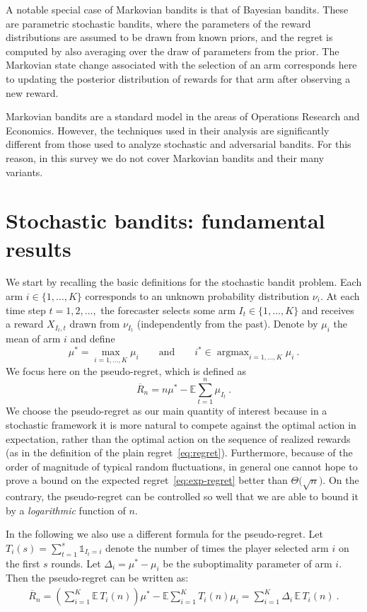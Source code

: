 \documentclass[11pt]{hackednow}
\newcommand{\E}{\mathbb{E}}
\newcommand{\oR}{\overline{R}}
\def\ds1{\mathds{1}}
\newcommand{\argmax}{\mathop{\mathrm{argmax}}}
\begin{document}
A notable special case of Markovian bandits is that of Bayesian bandits. These are parametric stochastic bandits, where the parameters of the reward distributions are assumed to be drawn from known priors, and the regret is computed by also averaging over the draw of parameters from the prior. The Markovian state change associated with the selection of an arm corresponds here to updating the posterior distribution of rewards for that arm after observing a new reward.

Markovian bandits are a standard model in the areas of Operations Research and Economics. However, the techniques used in their analysis are significantly different from those used to analyze stochastic and adversarial bandits. For this reason, in this survey we do not cover Markovian bandits and their many variants.


\chapter{Stochastic bandits: fundamental results}
\label{stochastic}
We start by recalling the basic definitions for the stochastic bandit problem. Each arm $i \in \{1, \hdots, K\}$ corresponds to an unknown probability distribution $\nu_i$. At each time step $t =1, 2, \hdots,$ the forecaster selects some arm $I_t \in \{1, \hdots, K\}$ and receives a reward $X_{I_t,t}$ drawn from $\nu_{I_t}$ (independently from the past). Denote by $\mu_i$ the mean of arm $i$ and define
\[
    \mu^*=\max_{i=1,\hdots,K} \mu_i \qquad\text{and}\qquad i^* \in \argmax_{i=1,\hdots,K} \mu_i~.
\]
We focus here on the pseudo-regret, which is defined as
\begin{equation} \label{eq:pseudoregretstocha}
\oR_n = n \mu^* - \E \sum_{t=1}^n \mu_{I_t}~.
\end{equation}
We choose the pseudo-regret as our main quantity of interest because in a stochastic framework it is more natural to compete against the optimal action in expectation, rather than the optimal action on the sequence of realized rewards (as in the definition of the plain regret~\eqref{eq:regret}). Furthermore, because of the order of magnitude of typical random fluctuations, in general one cannot hope to prove a bound on the expected regret~\eqref{eq:exp-regret} better than $\Theta\bigl(\sqrt{n}\bigr)$. On the contrary, the pseudo-regret can be controlled so well that we are able to bound it by a \textsl{logarithmic} function of $n$.

In the following we also use a different formula for the pseudo-regret. Let $T_{i}(s)=\sum_{t=1}^s \ds1_{I_t=i}$ denote the number of times the player selected arm $i$ on the first $s$ rounds. Let $\Delta_i = \mu^*-\mu_i$ be the suboptimality parameter of arm $i$. Then the pseudo-regret can be written as:
\begin{align*}
\oR_n =
\left( \sum_{i=1}^K \E\,T_i(n) \right) \mu^* - \E \sum_{i=1}^K T_i(n) \mu_i = \sum_{i=1}^K \Delta_i\, \E\,T_i(n)~.
\end{align*}
\end{document}
